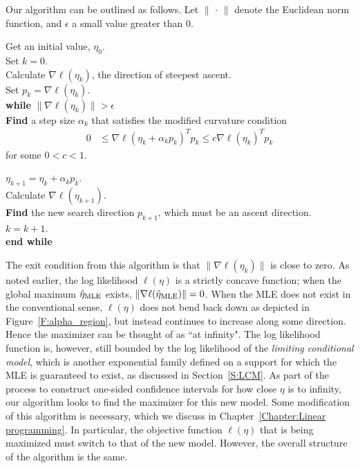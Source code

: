 Our algorithm can be outlined as follows.  Let $\lVert \, \cdot \, \rVert$ denote the 
Euclidean norm function, and $\epsilon$ 
a small value greater than 0.  \\

\begin{singlespace} 
{
\noindent Get an initial value, $\eta_0$.\\ 
Set $k=0$. \\
Calculate $\nabla \ell( \eta_k)$, the direction of steepest ascent. \\
Set $p_k = \nabla \ell( \eta_k)$. \\
\textbf{while}  $\lVert \nabla \ell( \eta_k) \rVert > \epsilon$ \\ 
\hspace{4mm} \indent	 
\textbf{Find} a step size $\alpha_k$ that satisfies the modified 
curvature condition
\begin{align*}
	 0 & \leq \nabla \ell( \eta_k + \alpha_k p_k)^T p_k \leq c \nabla \ell(\eta_k)^T 
p_k
\end{align*}
\indent for some $0 < c < 1$.  


$\eta_{k+1} = \eta_k + \alpha_k p_k$.\\
\indent Calculate $\nabla \ell( \eta_{k+1})$.\\
\indent \textbf{Find} the new search direction $p_{k+1}$, which must be an ascent 
direction. \\
\indent $k = k + 1$.  \\
\textbf{end while}\\
}
\end{singlespace}
The exit condition from this algorithm is that $\lVert \nabla \ell( \eta_k) \rVert$
is close to zero.  As noted earlier, the log likelihood $\ell(\eta)$ is a strictly
concave function; when the global maximum $\hat{\eta}_{\textrm{MLE}}$ exists, $\lVert \nabla \ell( \hat{\eta}_{\textrm{MLE}}) \rVert = 0$.  
When the MLE does not exist in the conventional sense, $\ell(\eta)$ does not bend
 back down as depicted in Figure~\ref{F:alpha_region}, but instead continues to increase along some direction.  Hence the maximizer can be thought of as ``at infinity".
The log likelihood function is, however, still bounded by 
the log likelihood of 
the \emph{limiting conditional model}, which 
is another exponential family defined on a support for which the MLE is
guaranteed to exist, as discussed in Section~\ref{S:LCM}.
As part of the process to construct one-sided confidence intervals 
for how close $\eta$ is to infinity, 
our algorithm looks to find the maximizer for this new model.  
Some modification of this algorithm is necessary, which we discuss in 
Chapter~\ref{Chapter:Linear programming}.  In particular, the objective function
$\ell( \eta)$ that is being maximized must switch to that of the new model.
However, the overall structure of the algorithm is the same.

